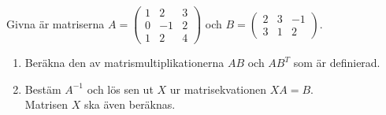 \documentclass[11pt]{article}
\begin{document}
Givna är matriserna $A = \begin{pmatrix}
    1 &  2 & 3\\
    0 & -1 & 2\\
    1 &  2 & 4
\end{pmatrix}$ och $B = \begin{pmatrix}
    2 & 3 & -1\\
    3 & 1 & 2
\end{pmatrix}$.
\begin{enumerate}[label=(\alph*)]
    \item Beräkna den av matrismultiplikationerna $AB$ och $AB^T$ som är definierad.
    \item Bestäm $A^{-1}$ och lös sen ut $X$ ur matrisekvationen $XA = B$.\\
        Matrisen $X$ ska även beräknas.
\end{enumerate}
\end{document}

